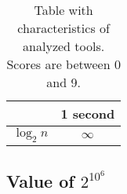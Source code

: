 \begin{table}[!t]
\begin{center}
\begin{tabular}{cc}
\toprule
& 1 second \\
\midrule

$\log_2 n$ & $\infty$ \\
\bottomrule
\end{tabular}
\end{center}
\caption{Table with characteristics of analyzed tools. Scores are between 0 and 9.}
\label{table_scores}
\end{table}

\begin{largenumber}
\section{Value of $2^{10^6}$}


\end{largenumber}

